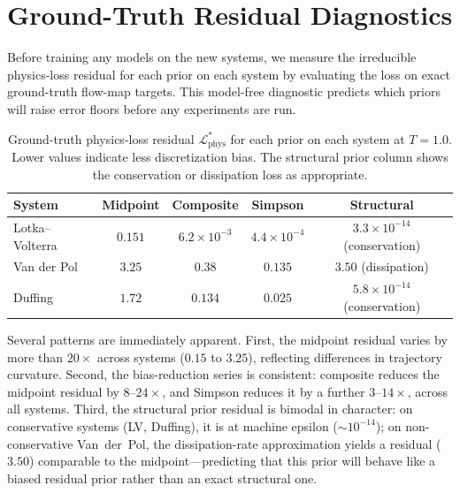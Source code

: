 \documentclass[11pt]{article}
\begin{document}
\section{Ground-Truth Residual Diagnostics}
\label{sec:gt-residuals}

Before training any models on the new systems, we measure the irreducible physics-loss residual for each prior on each system by evaluating the loss on exact ground-truth flow-map targets.
This model-free diagnostic predicts which priors will raise error floors before any experiments are run.

\begin{table}[H]
    \centering
    \caption{Ground-truth physics-loss residual $\mathcal{L}_{\mathrm{phys}}^*$ for each prior on each system at $T = 1.0$.
    Lower values indicate less discretization bias.
    The structural prior column shows the conservation or dissipation loss as appropriate.}
    \label{tab:gt-residuals}
    \small
    \begin{tabular}{lcccc}
        \toprule
        System & Midpoint & Composite & Simpson & Structural \\
        \midrule
        Lotka--Volterra & $0.151$ & $6.2 \times 10^{-3}$ & $4.4 \times 10^{-4}$ & $3.3 \times 10^{-14}$ (conservation) \\
        Van der Pol     & $3.25$  & $0.38$               & $0.135$              & $3.50$ (dissipation) \\
        Duffing         & $1.72$  & $0.134$              & $0.025$              & $5.8 \times 10^{-14}$ (conservation) \\
        \bottomrule
    \end{tabular}
\end{table}

Several patterns are immediately apparent.
First, the midpoint residual varies by more than $20\times$ across systems ($0.15$ to $3.25$), reflecting differences in trajectory curvature.
Second, the bias-reduction series is consistent: composite reduces the midpoint residual by $8$--$24\times$, and Simpson reduces it by a further $3$--$14\times$, across all systems.
Third, the structural prior residual is bimodal in character: on conservative systems (LV, Duffing), it is at machine epsilon ($\sim\!10^{-14}$); on non-conservative Van~der~Pol, the dissipation-rate approximation yields a residual ($3.50$) comparable to the midpoint---predicting that this prior will behave like a biased residual prior rather than an exact structural one.
\end{document}
